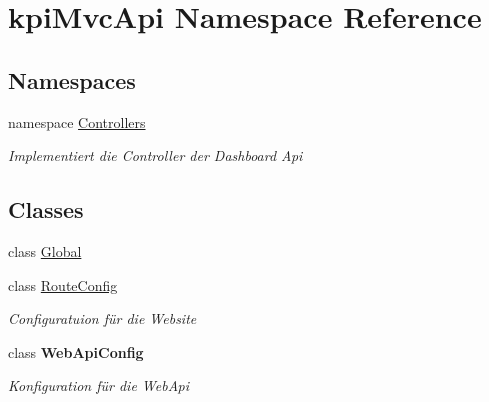 \hypertarget{namespacekpi_mvc_api}{}\section{kpi\+Mvc\+Api Namespace Reference}
\label{namespacekpi_mvc_api}
\subsection*{Namespaces}
\begin{DoxyCompactItemize}
\item 
namespace \hyperlink{namespacekpi_mvc_api_1_1_controllers}{Controllers}
\begin{DoxyCompactList}\small\item\em Implementiert die Controller der Dashboard Api \end{DoxyCompactList}\end{DoxyCompactItemize}
\subsection*{Classes}
\begin{DoxyCompactItemize}
\item 
class \hyperlink{classkpi_mvc_api_1_1_global}{Global}
\item 
class \hyperlink{classkpi_mvc_api_1_1_route_config}{Route\+Config}
\begin{DoxyCompactList}\small\item\em Configuratuion für die Website \end{DoxyCompactList}\item 
class {\bfseries Web\+Api\+Config}
\begin{DoxyCompactList}\small\item\em Konfiguration für die Web\+Api \end{DoxyCompactList}\end{DoxyCompactItemize}
